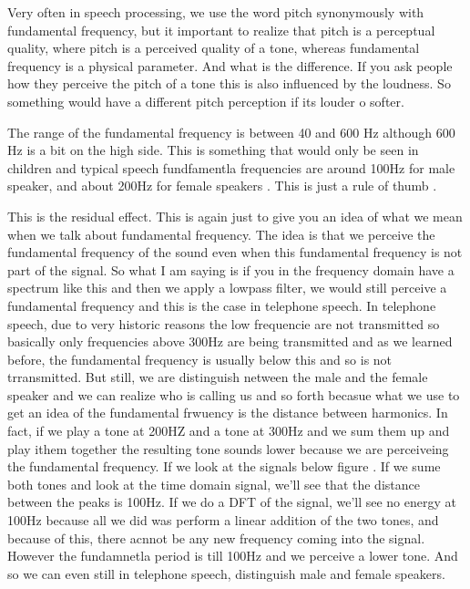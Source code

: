Very often in speech processing, we use the word pitch synonymously with fundamental frequency, but it important to realize that pitch is a perceptual quality, where pitch is a perceived quality of a tone, whereas fundamental frequency is a physical parameter. And what is the difference. If you ask people how they perceive the pitch of a tone this is also influenced by the loudness. So something would have a different pitch perception if its louder o softer. 

The range of the fundamental frequency is between 40 and 600 Hz although 600 Hz is a bit on the high side.  This is something that would only be seen in children and typical speech fundfamentla frequencies are around 100Hz for male speaker, and about 200Hz for female speakers . This is just a rule of thumb
.

This is the residual effect. This is again just to give you an idea of what we mean when we talk about fundamental frequency. The idea is that we perceive the fundamental frequency of the sound even when this fundamental frequency is not part of the signal.  So what I am saying is if you in the frequency domain have a spectrum like this and then we apply a lowpass filter, we would still perceive a fundamental frequency and this is the case in telephone speech. In telephone speech, due to very historic reasons the low frequencie are not transmitted so basically only frequencies above 300Hz are being transmitted and as we learned before, the fundamental frequency is usually below this and so is not trransmitted.  But still, we are  distinguish netween the male and the female speaker and we can realize who is calling us and so forth becasue what we use to get an idea of the fundamental frwuency is the distance between harmonics. In fact, if we play a tone at 200HZ and a tone at 300Hz and we sum them up and play ithem together the resulting tone sounds lower because we are perceiveing the fundamental frequency. If we look at the signals below figure . If we sume both tones and look at the time domain signal, we'll see that the distance between the peaks is 100Hz. If we do a DFT of the signal, we'll see no energy at 100Hz because all we did was perform a linear addition of the two tones, and because of this, there acnnot be any new frequency coming into the signal.  However the fundamnetla period is till 100Hz and we perceive a lower tone. And so we can even still in telephone speech, distinguish male and female speakers. 

